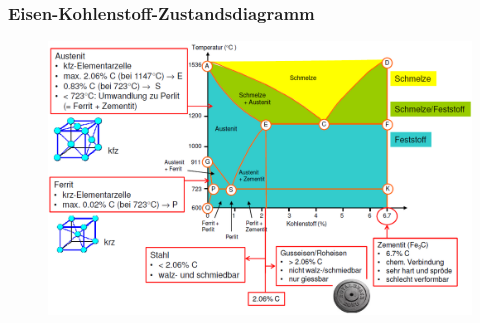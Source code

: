 \subsubsection{Eisen-Kohlenstoff-Zustandsdiagramm}
\begin{figure}[htbp]
	\centering
	\includegraphics[width=0.95\linewidth]{images/3_Eisen_Kohlenstoff_Diagramm.png}
\end{figure}
